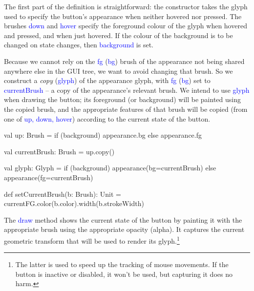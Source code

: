 \documentclass[12pt,a4paper]{article}
\def\Scala#1{\textcolor{blue}{\textsf{#1}}}
\begin{document}
The first part of the definition is straightforward: the constructor
takes the glyph used to specify the button's appearance when neither
hovered nor pressed. The brushes \Scala{down} and \Scala{hover} specify
the foreground colour of the glyph when hovered and pressed, and when
just hovered. If the colour of the background is to be changed on
state changes, then \Scala{background} is set.

\begin{scala}
class ColourButton(
  appearance:     Glyph,
  down:           Brush,
  hover:          Brush,
  val background: Boolean, 
  val react:      Reaction) extends GenericButton {
  
  override def toString: String =
           s"ColourButton($up, $down, $hover, $background)"
\end{scala}

Because we cannot rely on the \Scala{fg} (\Scala{bg}) brush of the appearance
not being shared anywhere else in the GUI tree, we want to avoid
changing that brush. So we construct a \textit{copy} (\Scala{glyph})
of the appearance glyph, with \Scala{fg} (\Scala{bg}) set to \Scala{currentBrush}
-- a copy of the appearance's relevant brush. We intend to use
\Scala{glyph} when drawing the button; its  foreground (or background)  will
be painted using the copied brush, and the appropriate features of
that brush will be copied (from one of \Scala{up, down, hover})
according to the current state of the button.

\begin{scala}
   val up: Brush =
       if (background) appearance.bg else appearance.fg

   val currentBrush: Brush = up.copy()

   val glyph: Glyph        =
       if (background)
          appearance(bg=currentBrush)
       else
          appearance(fg=currentBrush)

   def setCurrentBrush(b: Brush): Unit = {
      currentFG.color(b.color).width(b.strokeWidth)
    }
\end{scala}

The \Scala{draw} method shows the current state of the
button by painting it with the appropriate brush using
the appropriate opacity (alpha).
It captures the current geometric transform that
will be used to render its glyph.\footnote{ The latter is used to
speed up the tracking of mouse movements. If the button is inactive or disabled,
it won't be used, but capturing it does no harm.}
\end{document}
